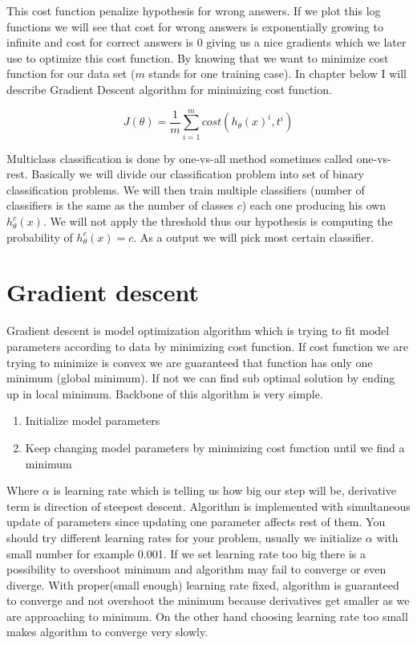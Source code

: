 This cost function penalize hypothesis for wrong answers. If we plot this log functions we will see that cost for wrong answers is exponentially growing to infinite and cost for correct answers is 0 giving us a nice gradients which we later use to optimize this cost function. By knowing that we want to minimize cost function for our data set (\(m\) stands for one training case). In chapter below I will describe Gradient Descent algorithm for minimizing cost function.

\begin{equation}
J(\theta) = \frac{1}{m}\sum\limits_{i=1}^m cost(h_\theta(x)^i, t^i)
\end{equation}

Multiclass classification is done by one-vs-all method sometimes called one-vs-rest. Basically we will divide our classification problem into set of binary classification problems. We will then train multiple classifiers (number of classifiers is the same as the number of classes \(c\)) each one producing his own \(h_\theta^c(x)\). We will not apply the threshold thus our hypothesis is computing the probability of \(h_\theta^c(x) = c\). As a output we will pick most certain classifier.

\section{Gradient descent}
Gradient descent is model optimization algorithm which is trying to fit model parameters according to data by minimizing cost function. If cost function we are trying to minimize is convex we are guaranteed that function has only one minimum (global minimum). If not we can find sub optimal solution by ending up in local minimum. Backbone of this algorithm is very simple.

\begin{enumerate}
\item Initialize model parameters
\item Keep changing model parameters by minimizing cost function until we find a minimum
\end{enumerate}

\begin{algorithm}[h]
\end{algorithm}

Where \(\alpha\) is learning rate which is telling us how big our step will be, derivative term is direction  of steepest descent. Algorithm is implemented with simultaneous update of parameters since updating one parameter affects rest of them. You should try different learning rates for your problem, usually we initialize \(\alpha\) with small number for example 0.001. If we set learning rate too big there is a possibility to overshoot minimum and algorithm may fail to converge or even diverge. With proper(small enough) learning rate fixed, algorithm is guaranteed to converge and not overshoot the minimum because derivatives get smaller as we are approaching to minimum. On the other hand choosing learning rate too small makes algorithm to converge very slowly.

